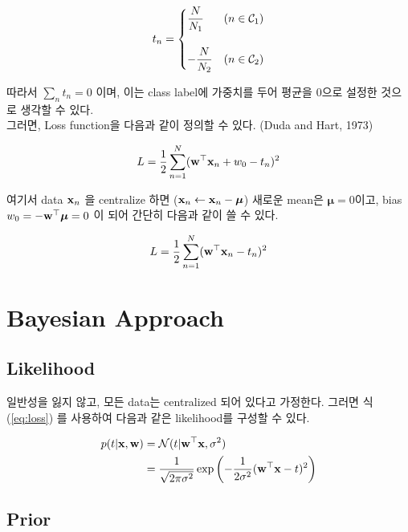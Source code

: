 \documentclass{article} %
\begin{document}
\begin{equation}
t_n = 
\begin{cases}
	\dfrac{N}{N_1} & (n \in {\cal C}_1) \\\\
	-\dfrac{N}{N_2} & (n \in {\cal C}_2)
\end{cases}
\end{equation}

따라서 $\sum_n t_n = 0$ 이며, 이는 class label에 가중치를 두어 평균을 0으로 설정한 것으로 생각할 수 있다.\\ 

그러면, Loss function을 다음과 같이 정의할 수 있다. (Duda and Hart, 1973)

\begin{equation}
	L = \frac{1}{2} \sum_{n = 1}^N ({\bf w}^\top {\bf x}_n + w_0 - t_n)^2
\end{equation}

여기서 data ${\bf x}_n$ 을 centralize 하면 (${\bf x}_n \leftarrow {\bf x}_n - \boldsymbol{\mu}$) 새로운 mean은 $\boldsymbol{\mu} = 0$이고, bias $w_0 = - {\bf w}^\top \boldsymbol{\mu} = 0$ 이 되어 간단히 다음과 같이 쓸 수 있다.

\begin{equation}
	L = \frac{1}{2} \sum_{n = 1}^N ({\bf w}^\top {\bf x}_n - t_n)^2
	\label{eq:loss}
\end{equation}

\section{Bayesian Approach}
\subsection{Likelihood}

일반성을 잃지 않고, 모든 data는 centralized 되어 있다고 가정한다. 그러면 식 (\ref{eq:loss}) 를 사용하여 다음과 같은 likelihood를 구성할 수 있다. 

\begin{equation}
\begin{aligned}
	p(t | {\bf x}, {\bf w}) &= {\cal N} (t | {\bf w}^\top {\bf x}, \sigma^2) \\
	&= \frac{1}{\sqrt{2 \pi \sigma^2}} \exp \left(-\frac{1}{2 \sigma^2} ({\bf w}^\top {\bf x} - t)^2 \right)
\end{aligned}
\end{equation}

\subsection{Prior}
\end{document}
